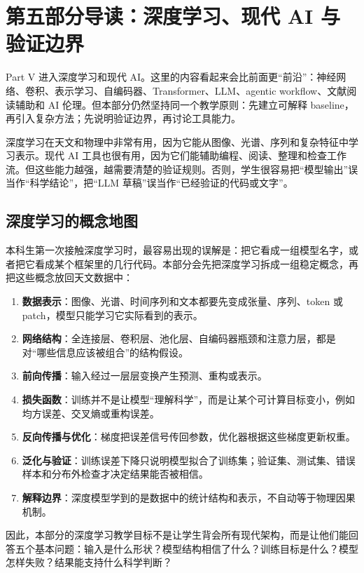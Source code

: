 \chapter*{第五部分导读：深度学习、现代 AI 与验证边界}

Part V 进入深度学习和现代 AI。这里的内容看起来会比前面更“前沿”：神经网络、卷积、表示学习、自编码器、Transformer、LLM、agentic workflow、文献阅读辅助和 AI 伦理。但本部分仍然坚持同一个教学原则：先建立可解释 baseline，再引入复杂方法；先说明验证边界，再讨论工具能力。

深度学习在天文和物理中非常有用，因为它能从图像、光谱、序列和复杂特征中学习表示。现代 AI 工具也很有用，因为它们能辅助编程、阅读、整理和检查工作流。但这些能力越强，越需要清楚的验证规则。否则，学生很容易把“模型输出”误当作“科学结论”，把“LLM 草稿”误当作“已经验证的代码或文字”。

\section*{深度学习的概念地图}

本科生第一次接触深度学习时，最容易出现的误解是：把它看成一组模型名字，或者把它看成某个框架里的几行代码。本部分会先把深度学习拆成一组稳定概念，再把这些概念放回天文数据中：

\begin{enumerate}
    \item \textbf{数据表示}：图像、光谱、时间序列和文本都要先变成张量、序列、token 或 patch，模型只能学习它实际看到的表示。
    \item \textbf{网络结构}：全连接层、卷积层、池化层、自编码器瓶颈和注意力层，都是对“哪些信息应该被组合”的结构假设。
    \item \textbf{前向传播}：输入经过一层层变换产生预测、重构或表示。
    \item \textbf{损失函数}：训练并不是让模型“理解科学”，而是让某个可计算目标变小，例如均方误差、交叉熵或重构误差。
    \item \textbf{反向传播与优化}：梯度把误差信号传回参数，优化器根据这些梯度更新权重。
    \item \textbf{泛化与验证}：训练误差下降只说明模型拟合了训练集；验证集、测试集、错误样本和分布外检查才决定结果能否被相信。
    \item \textbf{解释边界}：深度模型学到的是数据中的统计结构和表示，不自动等于物理因果机制。
\end{enumerate}

因此，本部分的深度学习教学目标不是让学生背会所有现代架构，而是让他们能回答五个基本问题：输入是什么形状？模型结构相信了什么？训练目标是什么？模型怎样失败？结果能支持什么科学判断？


